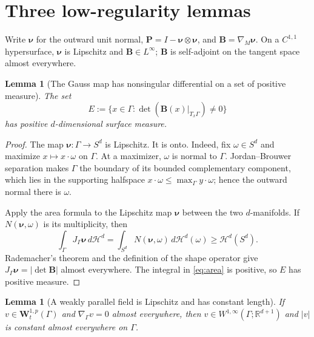 \documentclass[11pt]{article}
\newtheorem{lemma}[theorem]{Lemma}
\newcommand{\R}{\mathbb R}
\newcommand{\G}{\Gamma}
\newcommand{\nuG}{\boldsymbol\nu}
\newcommand{\BG}{\mathbf B}
\newcommand{\PG}{\mathbf P}
\newcommand{\nG}{\nabla_{\!\G}}
\newcommand{\nM}{\nabla_{\!M}}
\newcommand{\Wtp}[1]{\mathbf W^{1,#1}_t(\G)}
\begin{document}
\section{Three low-regularity lemmas}

Write $\nuG$ for the outward unit normal, $\PG=I-\nuG\otimes\nuG$, and
$\BG=\nM\nuG$.  On a $C^{1,1}$ hypersurface, $\nuG$ is Lipschitz and
$\BG\in L^\infty$; $\BG$ is self-adjoint on the tangent space almost
everywhere.

\begin{lemma}[The Gauss map has nonsingular differential on a set of positive
measure]\label{lem:gauss-map}
The set
\[
 E:=\{x\in\G:\det(\BG(x)|_{T_x\G})\ne0\}
\]
has positive $d$-dimensional surface measure.
\end{lemma}

\begin{proof}
The map $\nuG:\G\to S^d$ is Lipschitz.  It is onto.  Indeed, fix
$\omega\in S^d$ and maximize $x\mapsto x\cdot\omega$ on $\G$.  At a
maximizer, $\omega$ is normal to $\G$.  Jordan--Brouwer separation makes
$\G$ the boundary of its bounded complementary component, which lies in the
supporting halfspace $x\cdot\omega\le\max_{\G}y\cdot\omega$; hence the
outward normal there is $\omega$.

Apply the area formula to the Lipschitz map $\nuG$ between the two
$d$-manifolds.  If $N(\nuG,\omega)$ is its multiplicity, then
\begin{equation}\label{eq:area}
 \int_{\G}J_{\G}\nuG\,d\mathcal H^d
 =\int_{S^d}N(\nuG,\omega)\,d\mathcal H^d(\omega)
 \ge \mathcal H^d(S^d).
\end{equation}
Rademacher's theorem and the definition of the shape operator give
$J_{\G}\nuG=|\det\BG|$ almost everywhere.  The integral in
\eqref{eq:area} is positive, so $E$ has positive measure.
\end{proof}

\begin{lemma}[A weakly parallel field is Lipschitz and has constant
length]\label{lem:bootstrap}
If $v\in\Wtp p$ and $\nG v=0$ almost everywhere, then
$v\in W^{1,\infty}(\G;\R^{d+1})$ and $|v|$ is constant almost everywhere
on $\G$.
\end{lemma}
\end{document}

